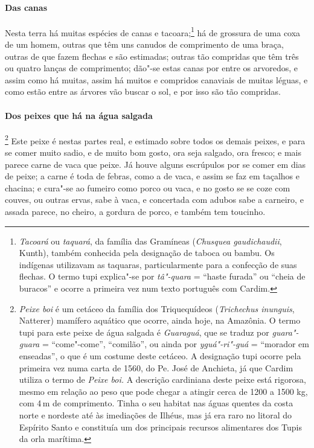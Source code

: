 \paragraph{Das canas}

Nesta terra há muitas espécies de canas e tacoara;\footnote{ \textit{Tacoará} 
ou \textit{taquará}, da família das Gramíneas
(\textit{Chusquea gaudichaudii}, Kunth), também conhecida pela
designação de taboca ou bambu. Os indígenas utilizavam as taquaras,
particularmente para a confecção de suas flechas. O termo tupi
explica"-se por \textit{tâ"-quara} = ``haste furada'' ou ``cheia de buracos''
e ocorre a primeira vez num texto português com Cardim.} há de grossura
de uma coxa de um homem, outras que têm uns canudos de comprimento de
uma braça, outras de que fazem flechas e são estimadas; outras tão
compridas que têm três ou quatro lanças de comprimento; dão"-se estas
canas por entre os arvoredos, e assim como há muitas, assim há muitos e
compridos canaviais de muitas léguas, e como estão entre as árvores vão
buscar o sol, e por isso são tão compridas.

\paragraph{Dos peixes que há na água salgada}

\footnote{ \textit{Peixe boi} é um cetáceo da
família dos Triquequídeos (\textit{Trichechus inunguis}, Natterer)
mamífero aquático que ocorre, ainda hoje, na Amazônia. O termo tupi
para este peixe de água salgada é \textit{Guaraguá}, que se
traduz por \textit{guara"-guara} = ``come"-come'', ``comilão'', ou ainda
por \textit{yguá"-ri"-guá} = ``morador em enseadas'', o que é um costume
deste cetáceo. A designação tupi ocorre pela primeira vez numa carta 
de 1560, do Pe. José de Anchieta, já que Cardim utiliza o termo
de \textit{Peixe boi.} A descrição cardiniana deste peixe está
rigorosa, mesmo em relação ao peso que pode chegar a atingir cerca de
1200 a 1500 kg, com 4\,m de comprimento. Tinha o seu habitat nas águas
quentes da costa norte e nordeste até às imediações de Ilhéus, mas já
era raro no litoral do Espírito Santo e constituía um dos principais
recursos alimentares dos Tupis da orla marítima.} Este
peixe é nestas partes real, e estimado sobre todos os demais peixes, e
para se comer muito sadio, e de muito bom gosto, ora seja salgado, ora
fresco; e mais parece carne de vaca que peixe. Já houve alguns
escrúpulos por se comer em dias de peixe; a carne é toda de febras,
como a de vaca, e assim se faz em taçalhos e chacina; e cura"-se ao
fumeiro como porco ou vaca, e no gosto se se coze com couves, ou outras
ervas, sabe à vaca, e concertada com adubos sabe a carneiro, e assada
parece, no cheiro, a gordura de porco, e também tem toucinho.

